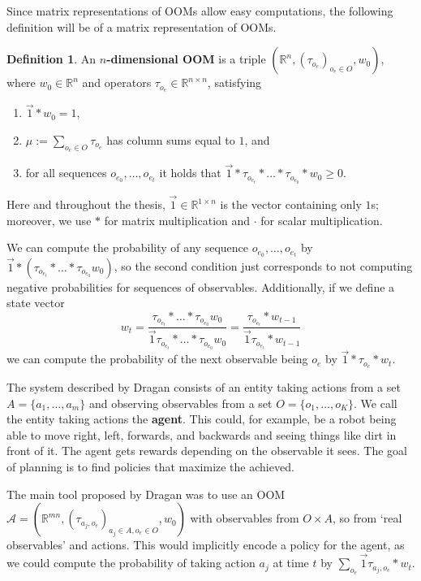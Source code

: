 \documentclass{article}
\theoremstyle{definition}
\newtheorem{definition}{Definition}
\begin{document}
Since matrix representations of OOMs allow easy computations, the following definition will be of a matrix representation of OOMs.
\begin{definition}
An \textbf{$n$-dimensional OOM} is a triple $(\mathbb{R}^{n},(\tau_{o_e})_{o_e \in O}, w_0)$, where $w_0 \in \mathbb{R}^n$ and operators $\tau_{o_e}\in \mathbb{R}^{n\times n}$, satisfying 
\begin{enumerate}
	\item $\vec{1}*w_0=1 $, 
	\item $\mu:=\sum_{o_e\in O} \tau_{o_e}$ has column sums equal to $1$, and
	\item for all sequences $o_{e_0},\ldots,o_{e_{t}}$ it holds that $\vec{1}*\tau_{o_{e_t}}*\ldots*\tau_{o_{e_{0}}}*w_0 \geq 0$. 
\end{enumerate}
\end{definition}
Here and throughout the thesis, $\vec{1} \in \mathbb{R}^{1 \times n}$ is the vector containing only $1$s; moreover, we use $*$ for matrix multiplication and $\cdot$ for scalar multiplication. 

We can compute the probability of any sequence $o_{e_0},\ldots,o_{e_{t}}$ by $\vec{1}*(\tau_{o_{e_t}}*\ldots*\tau_{o_{e_{0}}}w_0)$, so the second condition just corresponds to not computing negative probabilities for sequences of observables. 
Additionally, if we define a state vector 
\[w_t=\frac{\tau_{o_{e_t}}*\ldots*\tau_{o_{e_{0}}}w_0}{\vec{1}\tau_{o_{e_t}}*\ldots*\tau_{o_{e_{0}}}w_0}=\frac{\tau_{o_{e_t}}*w_{t-1}}{\vec{1}\tau_{o_{e_t}}*w_{t-1}}
\]
 we can compute the probability of the next observable being $o_e$ by $\vec{1}*\tau_{o_e}*w_t$. 

The system described by Dragan consists of an entity taking actions from a set $A=\{a_1,\ldots,a_m\}$ and observing observables from a set $O=\{o_1,\ldots,o_K\}$. We call the entity taking actions the {\bf{agent}}. This could, for example, be a robot being able to move right, left, forwards, and backwards and seeing things like dirt in front of it. The agent gets rewards depending on the observable it sees. The goal of planning is to find policies that maximize the  achieved. 

The main tool proposed by Dragan was to use an OOM $\mathcal{A}=(\mathbb{R}^{mn},(\tau_{a_j,o_e})_{a_j\in A,o_e\in O},w_0)$  with observables from $O\times A$, so from `real observables' and actions. This would implicitly encode a policy for the agent, as we could compute the probability of taking action $a_j$ at time $t$ by $\sum\limits_{o_e} \vec{1}\tau_{a_j,o_e}*w_t$. 
\end{document}
